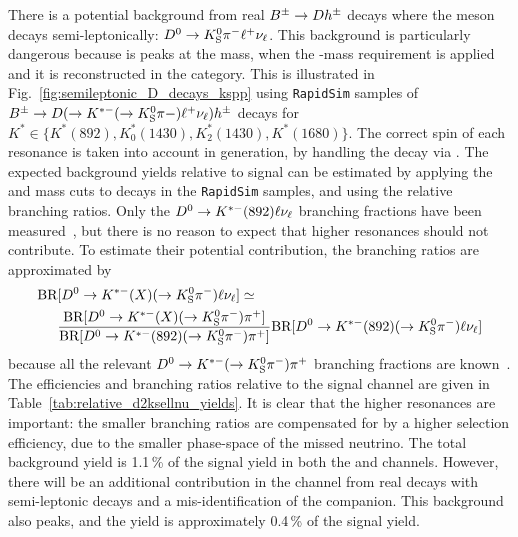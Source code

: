 There is a potential background from real ${{B}^\pm}\rightarrow{\ensuremath{D}} h^\pm$ decays where the \D meson decays semi-leptonically: ${{D}^0}\rightarrow{\ensuremath{{K}^0_{\mathrm{S}}}}{\ensuremath{{\pi}^-}}\ell^+\nu_\ell$. This background is particularly dangerous because is peaks at the \B mass, when the \D-mass requirement is applied and it is reconstructed in the \DtoKspipi category. This is illustrated in Fig.~\ref{fig:semileptonic_D_decays_kspp} using \texttt{RapidSim} samples of ${{B}^\pm}\rightarrow{\ensuremath{D}}(\rightarrow K^{*-}(\rightarrow {\ensuremath{{K}^0_{\mathrm{S}}}}\pi-)\ell^+\nu_\ell)h^\pm $ decays for $K^{*}\in\{K^*(892), K^*_0(1430), K^*_2(1430), K^*(1680)\}$. The correct spin of each resonance is taken into account in generation, by handling the decay via \evtgen. The expected background yields relative to signal can be estimated by applying the \B and \D mass cuts to decays in the \texttt{RapidSim} samples, and using the relative branching ratios. Only the ${{D}^0}\rightarrow{\ensuremath{{K}^{*-}}}(892)\ell\nu_\ell$ branching fractions have been measured~\cite{PDG2020}, but there is no reason to expect that higher \Kstar resonances should not contribute. To estimate their potential contribution, the branching ratios are approximated by
\begin{align*}
    \text{BR}&[{{D}^0}\rightarrow{\ensuremath{{K}^{*-}}}(X)(\rightarrow{\ensuremath{{K}^0_{\mathrm{S}}}}{\ensuremath{{\pi}^-}})\ell\nu_\ell] \simeq\\& \frac{\text{BR}[{{D}^0}\rightarrow{\ensuremath{{K}^{*-}}}(X)(\rightarrow{\ensuremath{{K}^0_{\mathrm{S}}}}{\ensuremath{{\pi}^-}}){{\pi}^+}] }{\text{BR}[{{D}^0}\rightarrow{\ensuremath{{K}^{*-}}}(892)(\rightarrow{\ensuremath{{K}^0_{\mathrm{S}}}}{\ensuremath{{\pi}^-}}){{\pi}^+}] }\text{BR}[{{D}^0}\rightarrow{\ensuremath{{K}^{*-}}}(892)(\rightarrow{\ensuremath{{K}^0_{\mathrm{S}}}}{\ensuremath{{\pi}^-}})\ell\nu_\ell] 
\end{align*}
because all the relevant ${{D}^0}\rightarrow{\ensuremath{{K}^{*-}}}(\rightarrow{\ensuremath{{K}^0_{\mathrm{S}}}}{\ensuremath{{\pi}^-}}){{\pi}^+}$ branching fractions are known~\cite{PDG2020
}. The efficiencies and branching ratios relative to the signal channel are given in Table~\ref{tab:relative_d2ksellnu_yields}. It is clear that the higher \Kstar resonances are important: the smaller branching ratios are compensated for by a higher selection efficiency, due to the smaller phase-space of the missed neutrino. The total background yield is 1.1\,\% of the signal yield in both the \BtoDpi and \BtoDK channels. However, there will be an additional contribution in the \BtoDK channel from real \BtoDpi decays with semi-leptonic \D decays and a mis-identification of the companion. This background also peaks, and the yield is approximately 0.4\,\% of the \BtoDK signal yield.


